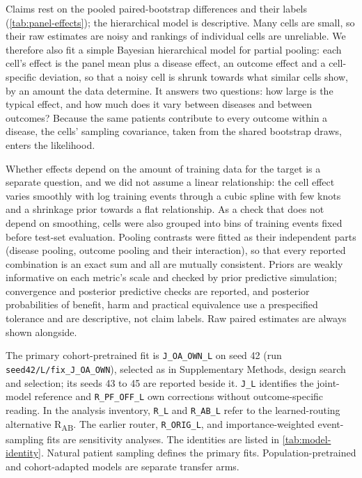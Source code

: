 Claims rest on the pooled paired-bootstrap differences and their labels
(\cref{tab:panel-effects}); the hierarchical model is descriptive. Many cells
are small, so their raw estimates
are noisy and rankings of individual cells are unreliable. We therefore also
fit a simple Bayesian hierarchical model for partial pooling: each cell's
effect is the panel mean plus a disease effect, an outcome effect and a
cell-specific deviation, so that a noisy cell is shrunk towards what similar
cells show, by an amount the data determine. It answers two questions: how
large is the typical effect, and how much does it vary between diseases and
between outcomes? Because the same patients contribute to every outcome within
a disease, the cells' sampling covariance, taken from the shared bootstrap
draws, enters the likelihood.

Whether effects depend on the amount of training data for the target is a
separate question, and we did not assume a linear relationship: the cell effect
varies smoothly with log training events through a cubic spline with few knots
and a shrinkage prior towards a flat relationship. As a check that does not
depend on smoothing, cells were also grouped into bins of training events fixed
before test-set evaluation. Pooling contrasts were fitted as their independent
parts (disease pooling, outcome pooling and their interaction), so that every
reported combination is an exact sum and all are mutually consistent. Priors
are weakly informative on each metric's scale and checked by prior predictive
simulation; convergence and posterior predictive checks are reported, and
posterior probabilities of benefit, harm and practical equivalence use a
prespecified tolerance and are descriptive, not claim labels. Raw paired estimates are always shown alongside.


\FloatBarrier

The primary cohort-pretrained \opera{} fit is \texttt{J\_OA\_OWN\_L} on seed 42
(run \texttt{seed42/L/fix\_J\_OA\_OWN}), selected as in Supplementary Methods, design search and selection;
its seeds 43 to 45 are reported beside it. \texttt{J\_L} identifies the
joint-model reference and \texttt{R\_PF\_OFF\_L} own corrections without
outcome-specific reading. In the analysis inventory, \texttt{R\_L} and
\texttt{R\_AB\_L} refer to the learned-routing alternative
R\textsubscript{AB}. The earlier router, \texttt{R\_ORIG\_L}, and
importance-weighted event-sampling fits are sensitivity analyses.
The identities are listed in \cref{tab:model-identity}. Natural
patient sampling defines the primary fits. Population-pretrained and
cohort-adapted models are separate transfer arms.


